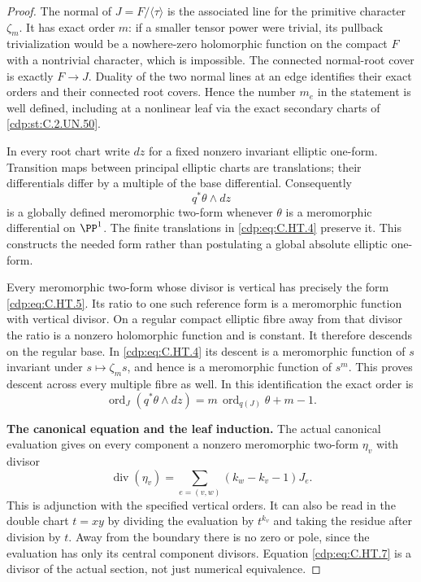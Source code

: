 \begin{proof}
The normal of $J=F/\langle\tau\rangle$ is the associated line for
the primitive character $\zeta_m$. It has exact order $m$:
if a smaller tensor power were trivial, its pullback trivialization
would be a nowhere-zero holomorphic function on the compact $F$
with a nontrivial character, which is impossible. The connected
normal-root cover is exactly $F\to J$. Duality of the two normal
lines at an edge identifies their exact orders and their connected
root covers. Hence the number $m_e$ in the statement is well defined,
including at a nonlinear leaf via the exact secondary charts of
\ref{cdp:st:C.2.UN.50}.

In every root chart write $dz$ for a fixed nonzero invariant
elliptic one-form. Transition maps between principal elliptic
charts are translations; their differentials differ by a multiple
of the base differential. Consequently
\[
                         q^*\theta\wedge dz             \tag{C.HT.5}\label{cdp:eq:C.HT.5}
\]
is a globally defined meromorphic two-form whenever $\theta$ is a
meromorphic differential on $\PP^1$. The finite translations in
\eqref{cdp:eq:C.HT.4} preserve it. This constructs the needed form rather than
postulating a global absolute elliptic one-form.

Every meromorphic two-form whose divisor is vertical has precisely
the form \eqref{cdp:eq:C.HT.5}. Its ratio to one such reference form is a
meromorphic function with vertical divisor. On a regular compact
elliptic fibre away from that divisor the ratio is a nonzero
holomorphic function and is constant. It therefore descends on
the regular base. In \eqref{cdp:eq:C.HT.4} its descent is a meromorphic function
of $s$ invariant under $s\mapsto\zeta_ms$, and hence is a
meromorphic function of $s^m$. This proves descent across every
multiple fibre as well. In this identification the exact order is
\[
 \operatorname{ord}_J(q^*\theta\wedge dz)
               =m\,\operatorname{ord}_{q(J)}\theta+m-1 .
                                                        \tag{C.HT.6}\label{cdp:eq:C.HT.6}
\]

\par\medskip\noindent\textbf{The canonical equation and the leaf induction.}
The actual canonical evaluation gives on every component a
nonzero meromorphic two-form $\eta_v$ with divisor
\[
 \operatorname{div}(\eta_v)
       =\sum_{e=(v,w)}(k_w-k_v-1)J_e .                 \tag{C.HT.7}\label{cdp:eq:C.HT.7}
\]
This is adjunction with the specified vertical orders. It can also
be read in the double chart $t=xy$ by dividing the evaluation by
$t^{k_v}$ and taking the residue after division by $t$. Away from
the boundary there is no zero or pole, since the evaluation has
only its central component divisors. Equation \eqref{cdp:eq:C.HT.7} is a divisor
of the actual section, not just numerical equivalence.


\end{proof}
